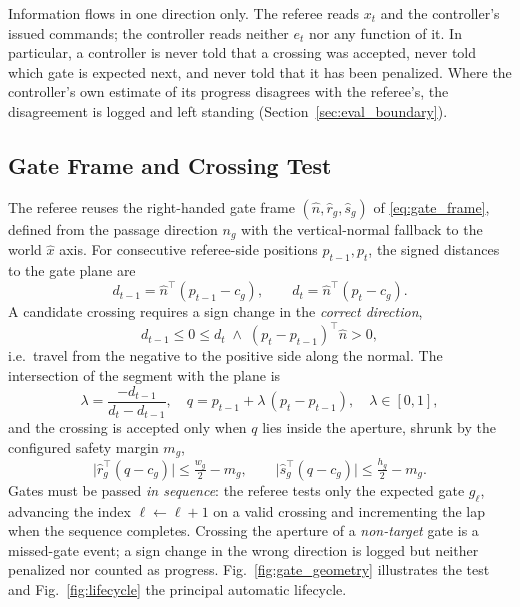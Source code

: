 Information flows in one direction only. The referee reads $x_t$ and the
controller's issued commands; the controller reads neither $e_t$ nor any function
of it. In particular, a controller is never told that a crossing was accepted,
never told which gate is expected next, and never told that it has been
penalized. Where the controller's own estimate of its progress disagrees with the
referee's, the disagreement is logged and left standing
(Section~\ref{sec:eval_boundary}).

\subsection{Gate Frame and Crossing Test}

The referee reuses the right-handed gate frame $(\hat{n},\hat{r}_g,\hat{s}_g)$ of
\eqref{eq:gate_frame}, defined from the passage direction $n_g$ with the
vertical-normal fallback to the world $\hat{x}$ axis. For consecutive
referee-side positions $p_{t-1},p_t$, the signed distances to the gate plane are
\begin{equation}
\label{eq:signed_dist}
d_{t-1}=\hat{n}^{\!\top}(p_{t-1}-c_g),\qquad d_t=\hat{n}^{\!\top}(p_t-c_g).
\end{equation}
A candidate crossing requires a sign change in the \emph{correct direction},
\begin{equation}
\label{eq:direction}
d_{t-1}\le 0\le d_t \;\wedge\; (p_t-p_{t-1})^{\!\top}\hat{n}>0,
\end{equation}
i.e.\ travel from the negative to the positive side along the normal. The
intersection of the segment with the plane is
\begin{equation}
\label{eq:intersection}
\lambda=\frac{-d_{t-1}}{d_t-d_{t-1}},\quad q=p_{t-1}+\lambda\,(p_t-p_{t-1}),\quad \lambda\in[0,1],
\end{equation}
and the crossing is accepted only when $q$ lies inside the aperture, shrunk by
the configured safety margin $m_g$,
\begin{equation}
\label{eq:aperture}
\big|\hat{r}_g^{\!\top}(q-c_g)\big|\le \tfrac{w_g}{2}-m_g,\qquad
\big|\hat{s}_g^{\!\top}(q-c_g)\big|\le \tfrac{h_g}{2}-m_g.
\end{equation}
Gates must be passed \emph{in sequence}: the referee tests only the expected gate
$g_{\ell}$, advancing the index $\ell\!\leftarrow\!\ell+1$ on a valid crossing and
incrementing the lap when the sequence completes. Crossing the aperture of a
\emph{non-target} gate is a missed-gate event; a sign change in the wrong
direction is logged but neither penalized nor counted as progress.
Fig.~\ref{fig:gate_geometry} illustrates the test and Fig.~\ref{fig:lifecycle}
the principal automatic lifecycle.

